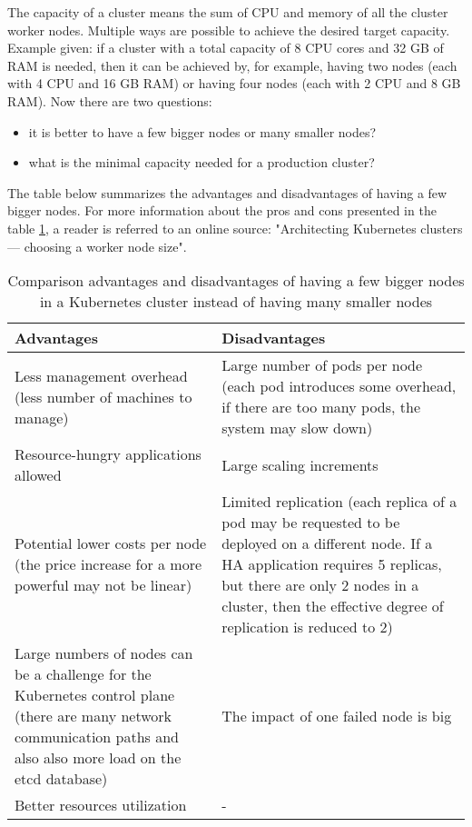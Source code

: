 The capacity of a cluster means the sum of CPU and memory of all the cluster worker nodes. Multiple ways are possible to achieve the desired target capacity. Example given: if a cluster with a total capacity of 8 CPU cores and 32 GB of RAM is needed, then it can be achieved by, for example, having two nodes (each with 4 CPU and 16 GB RAM) or having four nodes (each with 2 CPU and 8 GB RAM)\cite{kubernetes-node-size}. Now there are two questions:
\begin{itemize}
\item it is better to have a few bigger nodes or many smaller nodes?
\item what is the minimal capacity needed for a production cluster?
\end{itemize}

The table below summarizes the advantages and disadvantages of having a few bigger nodes. For more information about the pros and cons presented in the table \ref{tab:pros-cons-large-nodes}, a reader is referred to an online source: "Architecting Kubernetes clusters — choosing a worker node size"\cite{kubernetes-node-size}.

\begin{table}[H]
\begin{tabularx}{1\textwidth} {
  | >{\centering\arraybackslash}X
  | >{\centering\arraybackslash}X | }
 \hline
  \textbf{Advantages} & \textbf{Disadvantages}  \\
 \hline
 Less management overhead (less number of machines to manage)  & Large number of pods per node (each pod introduces some overhead, if there are too many pods, the system may slow down)   \\
 \hline
 Resource-hungry applications allowed  & Large scaling increments  \\
 \hline
  Potential lower costs per node (the price increase for a more powerful may not be linear)  & Limited replication (each replica of a pod may be requested to be deployed on a different node. If a HA application requires 5 replicas, but there are only 2 nodes in a cluster, then the effective degree of replication is reduced to 2)  \\
 \hline
  Large numbers of nodes can be a challenge for the Kubernetes control plane (there are many network communication paths and also also more load on the etcd database) & The impact of one failed node is big   \\
 \hline
  Better resources utilization & -  \\
 \hline
\end{tabularx}
\caption{\label{tab:pros-cons-large-nodes}Comparison advantages and disadvantages of having a few bigger nodes in a Kubernetes cluster instead of having many smaller nodes\cite{kubernetes-node-size}}
\end{table}

